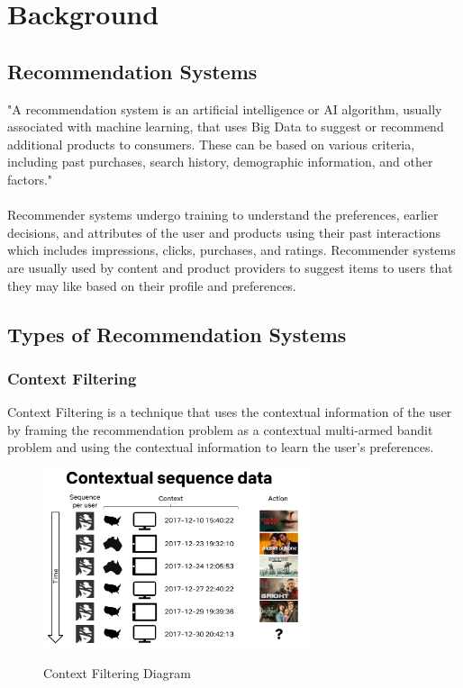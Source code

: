\chapter{Background}
\minitoc

\section{Recommendation Systems}\label{sec:recommendation-systems}
"A recommendation system is an artificial intelligence or AI algorithm, usually associated with machine learning, that uses Big Data to suggest or recommend additional products to consumers. These can be based on various criteria, including past purchases, search history, demographic information, and other factors."\cite{NvidiaRecSys} \\ \\
Recommender systems undergo training to understand the preferences, earlier decisions, and attributes of the user and products using their past interactions which includes impressions, clicks, purchases, and ratings. Recommender systems are usually used by content and product providers to suggest items to users that they may like based on their profile and preferences. 

\section{Types of Recommendation Systems}\label{sec:types-of-recommendation-systems}

\subsection{Context Filtering}
Context Filtering is a technique that uses the contextual information of the user by framing the recommendation problem as a contextual multi-armed bandit problem and using the contextual information to learn the user's preferences.
\begin{figure}[H]
    \centering
    \includegraphics[width=0.7\textwidth]{assets/contextual-sequence-prediction.png}
    \caption{Context Filtering Diagram}
    \label{fig:costextual-filtering}
    \cite{NvidiaRecSys}
\end{figure}
